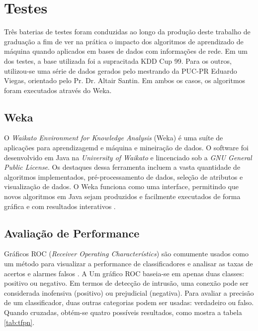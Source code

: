 \chapter{Testes}
Três baterias de testes foram conduzidas ao longo da produção deste trabalho de graduação a fim de ver na prática o
impacto dos algoritmos de aprendizado de máquina quando aplicados em bases de dados com informações de rede.
Em um dos testes, a base utilizada foi a supracitada KDD Cup 99. Para os outros, utilizou-se uma série de dados
 gerados pelo mestrando da PUC-PR Eduardo Viegas, orientado pelo Pr. Dr. Altair Santin. Em ambos os casos, os algoritmos foram
 executados através do Weka.

\section{Weka}
O \textit{Waikato Environment for Knowledge Analysis} (Weka) é uma suíte de aplicações para aprendizagemd e máquina e
mineiração de dados. O software foi desenvolvido em Java na \textit{University of Waikato} e lincenciado sob a
\textit{GNU General Public License}. Os destaques dessa ferramenta incluem a vasta quantidade de algoritmos
implementados, pré-processamento de dados, seleção de atributos e visualização de dados. O Weka funciona como uma
interface, permitindo que novos algoritmos em Java sejam produzidos e facilmente executados de forma gráfica e com
resultados interativos \cite{bouckaert10}.

\section{Avaliação de Performance}
Gráficos ROC (\textit{Receiver Operating Characterístics}) são comumente usados como um método  para visualizar
a performance de classificadores e analisar as taxas de acertos e alarmes falsos \cite{fawcett04}. A Um gráfico ROC
baseia-se em apenas duas classes: positivo ou negativo. Em termos de detecção de intrusão, uma conexão pode ser
considerada inofensiva (positivo) ou prejudicial (negativa). Para avaliar a precisão de um classificador,
duas outras categorias podem ser usadas: verdadeiro ou falso. Quando cruzadas, obtém-se quatro possíveis resultados,
como mostra a tabela \ref{tab:tfpn}.

